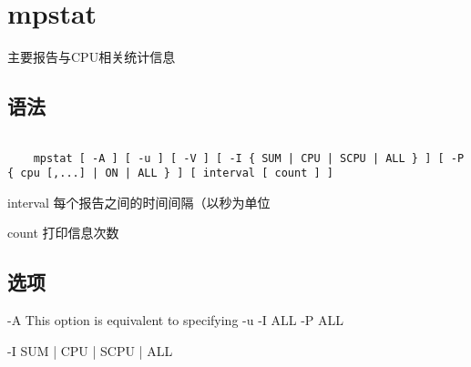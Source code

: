 \section{mpstat}
\label{chap:linux_mpstat}

主要报告与CPU相关统计信息


\subsection{语法}

\begin{lstlisting}[language=cshell]

    mpstat [ -A ] [ -u ] [ -V ] [ -I { SUM | CPU | SCPU | ALL } ] [ -P { cpu [,...] | ON | ALL } ] [ interval [ count ] ]

\end{lstlisting}

interval  每个报告之间的时间间隔（以秒为单位

count    打印信息次数

\subsection{选项}

-A     This option is equivalent to specifying -u -I ALL -P ALL

-I { SUM | CPU | SCPU | ALL }